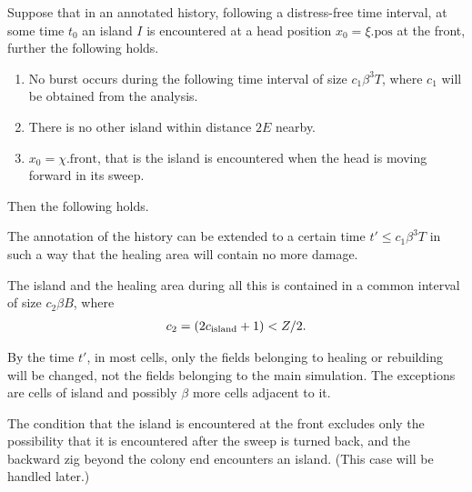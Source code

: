 \documentclass[12pt]{memoir}
\newcommand{\authnote}[3]
{\text{{ \textcolor{#3}{\( \langle\hspace{-0.2em}\langle \)\textsf{\footnotesize #1: #2}\( \rangle\hspace{-0.2em}\rangle \)}}}}
\newcommand{\authnote}[2]{}
\newcommand{\Pnote}[1]{{\authnote{Peter}{#1}{cyan}}}
\renewcommand{\le}{\leq}
\def\B{B}
\newcommand{\E}{E}
\newcommand{\pos}{\mathrm{pos}}
\newcommand{\Tu}{T}
\newcommand{\Z}{Z}
\newcommand{\front}{\mathrm{front}}
\newcommand{\cns}[1]{c_{\textrm{\upshape #1}}}
\begin{document}
\begin{lemma}\label{lem:healing.undisturbed.isolated.damage}
    Suppose that in an annotated history, following a distress-free time interval,
at some time \( t_{0} \)
an island \( I \) is encountered at a head position \( x_{0}=\xi.\pos \) at the front,
further the following holds.
\begin{enumerate}[\upshape (i)]
  \item No burst occurs during the following time interval of size
\( c_{1}\beta^{3}\Tu \), where \( c_{1} \) will be obtained from the analysis. 
\Pnote{Determine it!}
  \item There is no other island within distance \( 2\E \) nearby.
\item \( x_{0}=\chi.\front \), that is the island is encountered when the head is moving
forward in its sweep.
\end{enumerate}
Then the following holds.
\begin{alphenum}
\item\label{i:healing.undisturbed.isolated.damage.erase} The annotation of
the history can be extended to a certain time \( t'\le c_{1}\beta^{3}\Tu \) in such a way that
the healing area will contain no more damage.
 \item\label{i:healing.undisturbed.isolated.damage.size} 
The island and the healing area during all this is contained 
in a common interval of size \( c_{2}\beta\B \), where 
\begin{align*}
   c_{2}=(2\cns{island}+1) < \Z/2.
 \end{align*}

 \item\label{i:healing.undisturbed.isolated.damage.conserve} 
By the time \( t' \),  in most cells, only the fields belonging 
to healing or rebuilding will be changed, not the fields belonging to the main simulation.
The exceptions are cells of island and possibly \( \beta \) more
cells adjacent to it.
 \end{alphenum}

\end{lemma}
The condition that the island is encountered at the front excludes
only the possibility that it is encountered after the sweep is turned back,
and the backward zig beyond the colony end encounters an island.
(This case will be handled later.)
\end{document}
